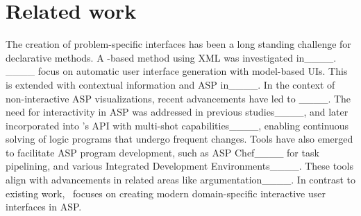 \section{Related work}
\label{sec:related}

The creation of problem-specific interfaces has been a long standing challenge for declarative methods.
A \prolog-based method using XML was investigated in____.
____ focus on automatic user interface generation with model-based UIs.
This is extended with contextual information and ASP in____.
In the context of non-interactive ASP visualizations, recent advancements have led to \clingraph____.
The need for interactivity in ASP was addressed in previous studies____,
and later incorporated into \clingo's API with multi-shot capabilities____,
enabling continuous solving of logic programs that undergo frequent changes.
Tools have also emerged to facilitate ASP program development,
such as ASP Chef____ for task pipelining,
and various Integrated Development Environments____.
These tools align with advancements in related areas like argumentation____.
In contrast to existing work,
\clinguin\ focuses on creating modern domain-specific interactive user interfaces in ASP.